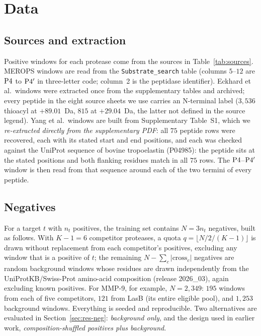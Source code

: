 \section{Data}
\label{sec:data}

\subsection{Sources and extraction}
Positive windows for each protease come from the sources in Table~\ref{tab:sources}. MEROPS windows are read from the \texttt{Substrate\_search} table (columns $5$--$12$ are $\mathrm{P}4$ to $\mathrm{P}4'$ in three-letter code; column~2 is the peptidase identifier). Eckhard et al.\ windows were extracted once from the supplementary tables and archived; every peptide in the eight source sheets we use carries an N-terminal label ($3{,}536$ thioacyl at $+89.01$~Da, $815$ at $+29.04$~Da, the latter not defined in the source legend). Yang et al.\ windows are built from Supplementary Table~S1, which we \emph{re-extracted directly from the supplementary PDF}: all $75$ peptide rows were recovered, each with its stated start and end positions, and each was checked against the UniProt sequence of bovine tropoelastin (P04985): the peptide sits at the stated positions and both flanking residues match in all $75$ rows. The $\mathrm{P}4$--$\mathrm{P}4'$ window is then read from that sequence around each of the two termini of every peptide.

\begin{table}[!htbp]
\centering\small
\caption{Positive windows per protease and source, after removing duplicate windows (a window reported by several sources is counted once, under the first). The faecal group is capped at $5{,}000$ windows drawn at random from $18{,}251$.}
\label{tab:sources}
\end{table}

\subsection{Negatives}
\label{sec:neg}
For a target $t$ with $n_t$ positives, the training set contains $N=3n_t$ negatives, built as follows. With $K-1=6$ competitor proteases, a quota $q=\lfloor N/2/(K-1)\rfloor$ is drawn without replacement from each competitor's positives, excluding any window that is a positive of $t$; the remaining $N-\sum_c |\text{cross}_c|$ negatives are random background windows whose residues are drawn independently from the UniProtKB/Swiss-Prot amino-acid composition (release 2026\_03), again excluding known positives. For MMP-9, for example, $N=2{,}349$: $195$ windows from each of five competitors, $121$ from LasB (its entire eligible pool), and $1{,}253$ background windows. Everything is seeded and reproducible. Two alternatives are evaluated in Section~\ref{sec:res-neg}: \emph{background only}, and the design used in earlier work, \emph{composition-shuffled positives plus background}.

